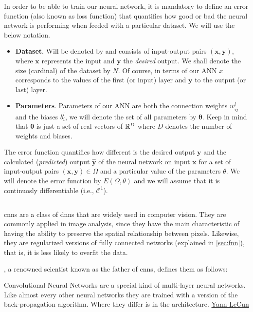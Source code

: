 In order to be able to train our neural network, it is mandatory to define an
error function (also known as loss function) that quantifies how good or bad
the neural network is performing when feeded with a particular dataset. We will
use the below notation.
\begin{itemize}
  \item \textbf{Dataset}. Will be denoted by and consists of input-output pairs
  \((\mathbf{x}, \mathbf{y})\), where \(\mathbf{x}\) represents the input and
  \(\mathbf{y}\) the \emph{desired} output. We shall denote the size (cardinal)
  of the dataset by \(N\). Of course, in terms of our ANN \(x\) corresponds to
  the values of the first (or input) layer and \(\mathbf{y}\) to the output (or
  last) layer.
  \item \textbf{Parameters}. Parameters of our ANN are both the connection
  weights \(w_{ij}^l\) and the biases \(b_i^l\), we will denote the set of all
  parameters by \(\bm{\theta}\). Keep in mind that \(\bm{\theta}\) is just a
  set of real vectors of \(\mathbb{R}^D\) where \(D\) denotes the number of weights and
  biases.
\end{itemize}

The error function quantifies how different is the desired output
\(\mathbf{y}\) and the calculated (\emph{predicted}) output
\(\mathbf{\hat{y}}\) of the neural network on input \(\mathbf{x}\) for a set of
input-output pairs \((\mathbf{x} , \mathbf{y}) \in \Omega\) and a particular
value of the parameters \(\theta\). We will denote the error function by
\(E (\Omega, \theta)\) and we will assume that it is continuosly differentiable
(i.e., \(\mathcal{C}^1\)).


\subsection{}\label{sec:conv-neur-netw}

\glspl{cnn} are a class of \glspl{dnn} that are widely used in computer
vision. They are commonly applied in image analysis, since they have the main
characteristic of having the ability to preserve the spatial relationship
between pixels. Likewise, they are regularized versions of fully connected
networks (explained in \vref{sec:fnn}), that is, it is less likely
to overfit the data.

, a renowned scientist
known as the father of \glspl{cnn}, defines them as follows:
\begin{quoteBox}
  Convolutional Neural Networks are a special kind of multi-layer neural
  networks. Like almost every other neural networks they are trained with a
  version of the back-propagation algorithm. Where they differ is in the
  architecture.
  \tcblower\href{http://yann.lecun.com/index.html}{Yann LeCun}
\end{quoteBox}

